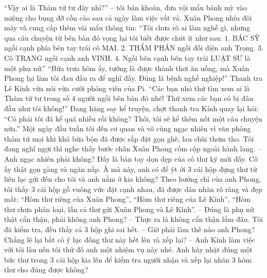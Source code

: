 	“Vậy ai là Thám tử tư đây nhỉ?” -- tôi băn khoăn, đưa vội mẩu bánh mỳ vào miệng cho bụng đỡ cồn cào sau cả ngày làm việc vất vả. 
	\vskip 0.1cm
	Xuân Phong nhíu đôi mày và cung cấp thêm vài mẩu thông tin: “Tôi chưa rõ ai làm nghề gì, nhưng qua câu chuyện từ bên bàn đó vọng lại tôi biết được chút ít như sau: 
	\vskip 0.1cm
	$1.$ BÁC SỸ ngồi cạnh phía bên tay trái cô MAI. 
	\vskip 0.1cm
	$2.$ THẨM PHÁN ngồi đối diện anh Trọng.
	\vskip 0.1cm
	$3.$ Cô TRANG ngồi cạnh anh VINH. 
	\vskip 0.1cm
	$4.$ Ngồi bên cạnh bên tay trái LUẬT SƯ là một phụ nữ.” 
	\vskip 0.1cm
	“Bữa trưa hôm ấy, tưởng là được thảnh thơi ăn uống, mà Xuân Phong lại làm tôi đau đầu ra để nghĩ đấy. Đúng là bệnh nghề nghiệp!” Thanh tra Lê Kính vừa nói vừa cười phóng viên của Pi. “Các bạn nhỏ thử tìm xem ai là Thám tử tư trong số $4$ người ngồi bên bàn đó nhé! Thử xem các bạn có bị đâu đầu như tôi không!”
	\vskip 0.1cm
	Đang hăng say kể truyện, chợt thanh tra Kính quay lại hỏi: “Có phải tôi đã kể quá nhiều rồi không? Thôi, tôi sẽ kể thêm nốt một câu chuyện nữa.”
	\vskip 0.1cm
	{\color{red}{BA CHIẾC HỘP VÀ CÔ THƯ KÝ}}
	\vskip 0.1cm
	Một ngày đầu tuần tôi đến cơ quan và vô cùng ngạc nhiên vì văn phòng thám tử mọi khi khá bừa bộn đã được sắp đặt gọn ghẽ, lau chùi thơm tho. Tôi đang nghĩ ngợi thì nghe thấy bước chân Xuân Phong cồm cộp ngoài hành lang. 
	\vskip 0.1cm
	-- Anh ngạc nhiên phải không? Đấy là bàn tay dọn dẹp của cô thư ký mới đấy. Cô ấy thật gọn gàng và ngăn nắp. À mà này, anh có để ýt ới $3$ cái hộp đựng thư từ liên lạc gửi đến cho tôi và anh nằm ở kia không? 
	\vskip 0.1cm
	Theo hướng chỉ của anh Phong, tôi thấy $3$ cái hộp gỗ vuông vức đặt cạnh nhau, đã được dán nhãn rõ ràng và đẹp mắt: “Hòm thư riêng của Xuân Phong”, “Hòm thư riêng của Lê Kính”, “Hòm thư chưa phân loại, lẫn cả thư gửi Xuân Phong và Lê Kính”. 
	\vskip 0.1cm
	-- Đúng là phụ nữ thật cẩn thận, phải không anh Phong? 
	\vskip 0.1cm
	-- Thực ra là không cẩn thận lắm đâu. Tôi đã kiểm tra, đều thấy cả $3$ hộp ghi sai hết. 
	\vskip 0.1cm
	-- Giờ phải làm thế nào anh Phong? Chẳng lẽ lại bắt cô ý lục đống thư này hết lên và xếp lại? 
	\vskip 0.1cm
	-- Anh Kính làm việc với tôi lâu nên tôi thử đố anh một nhiệm vụ này nhé. Anh hãy nhặt đúng một bức thư trong $3$ cái hộp kia lên để kiểm tra người nhận và xếp lại nhãn $3$ hòm thư cho đúng được không? 
